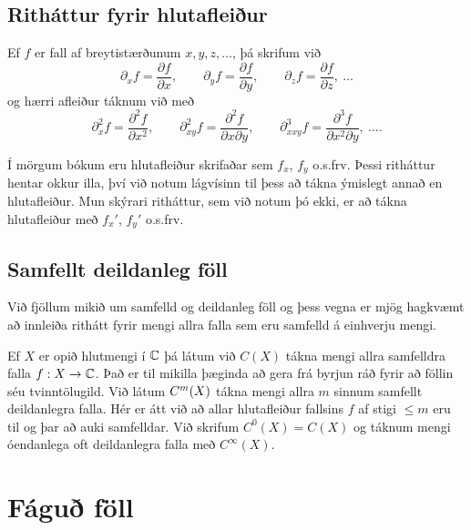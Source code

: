 \subsection*{Ritháttur fyrir hlutafleiður}


Ef $f$ er fall af breytistærðunum $x,y,z,\dots$, þá skrifum við
$$
{\partial}_xf=\dfrac{\partial f}{\partial x}, \qquad
{\partial}_yf=\dfrac{\partial f}{\partial y}, \qquad
{\partial}_zf=\dfrac{\partial f}{\partial z}, \ \dots
$$
og hærri afleiður táknum við með
$$
{\partial}_x^2f=\dfrac{\partial^2f}{\partial x^2}, \qquad
{\partial}_{xy}^2f=\dfrac{\partial^2f}{\partial x\partial y}, \qquad
{\partial}_{xxy}^3f=\dfrac{\partial^3f}{\partial x^2\partial y}, \ \dots.
$$

Í mörgum bókum eru hlutafleiður skrifaðar sem $f_{x}$, $f_y$ o.s.frv.
 Þessi
ritháttur hentar okkur illa, því við notum lágvísinn til þess að tákna
ýmislegt annað en hlutafleiður.  Mun skýrari ritháttur, sem við notum
þó ekki,  er að tákna
hlutafleiður með $f_x'$, $f_y'$ o.s.frv.  

\subsection*{Samfellt deildanleg föll}

\medskip\noindent
Við fjöllum mikið  um
samfelld og deildanleg föll  og 
þess vegna er mjög hagkvæmt að innleiða rithátt fyrir mengi allra falla
sem eru samfelld á einhverju mengi.


Ef $X$ er opið hlutmengi í ${\mathbb C}$ þá látum við $C(X)$ tákna mengi
allra samfelldra falla $f:X\to {\mathbb C}$.  Það er til mikilla þæginda að
gera frá byrjun ráð fyrir að föllin séu tvinntölugild.  Við látum
$C\sp m(X)$ tákna mengi allra $m$ sinnum samfellt
deildanlegra falla.
Hér er átt við að allar hlutafleiður fallsins $f$ af stigi $\leq m$
eru til og þar að auki samfelldar.  Við skrifum $C^0(X)=C(X)$ og
táknum mengi óendanlega oft deildanlegra falla með $C^{\infty}(X)$.


\section{Fáguð föll}


